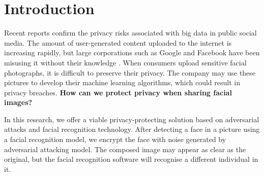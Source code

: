 \section{Introduction}

Recent reports \cite{6227909} confirm the privacy risks associated with big data in public social media. The amount of user-generated content uploaded to the internet is increasing rapidly, but large corporations such as Google and Facebook have been misusing it without their knowledge \cite{10.1093/idpl/ipw026}. When consumers upload sensitive facial photographs, it is difficult to preserve their privacy. The company may use these pictures to develop their machine learning algorithms, which could result in privacy breaches. \textbf{How can we protect privacy when sharing facial images?}

In this research, we offer a viable privacy-protecting solution based on adversarial attacks and facial recognition technology. After detecting a face in a picture using a facial recognition model, we encrypt the face with noise generated by adversarial attacking model. The composed image may appear as clear as the original, but the facial recognition software will recognise a different individual in it.

